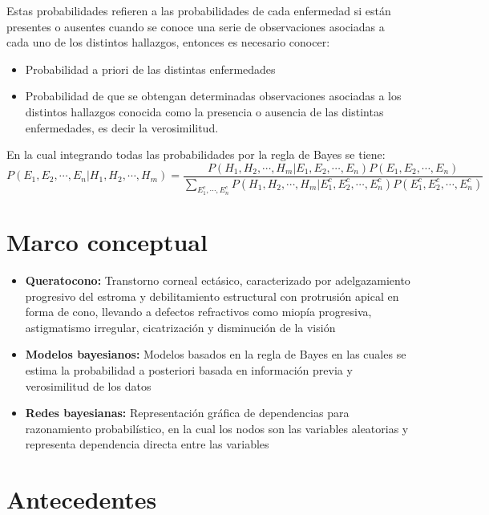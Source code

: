 Estas probabilidades refieren a las probabilidades de cada enfermedad si están presentes o ausentes cuando se conoce una serie de observaciones asociadas a cada uno de los distintos hallazgos, entonces es necesario conocer:

\begin{itemize}
\item Probabilidad a priori de las distintas enfermedades
\item Probabilidad de que se obtengan determinadas observaciones asociadas a los distintos hallazgos conocida como la presencia o ausencia de las distintas enfermedades, es decir la verosimilitud.
\end{itemize}
En la cual integrando todas las probabilidades por la regla de Bayes se tiene:
$$
P({E}_{1},{E}_{2},\cdots,{E}_{n}|{H}_{1},{H}_{2},\cdots,{H}_{m}) = \frac{P({H}_{1},{H}_{2},\cdots,{H}_{m}|{E}_{1},{E}_{2},\cdots,{E}_{n})P({E}_{1},{E}_{2},\cdots,{E}_{n})}{\sum\limits_{{E}_{1}^{c},\cdots,{E}_{n}^{c} }^{}P({H}_{1},{H}_{2},\cdots,{H}_{m}|{E}_{1}^{c},{E}_{2}^{c},\cdots,{E}_{n}^{c})P({E}_{1}^{c},{E}_{2}^{c},\cdots,{E}_{n}^{c})}
$$

\section{Marco conceptual}
\begin{itemize}
\item \textbf{Queratocono:} Transtorno corneal ectásico, caracterizado por adelgazamiento progresivo del estroma y debilitamiento estructural con protrusión apical en forma de cono, llevando a defectos refractivos como miopía progresiva, astigmatismo irregular, cicatrización y disminución de la visión \citep{caruso2024corneal}

\item \textbf{Modelos bayesianos:} Modelos basados en la regla de Bayes en las cuales se estima la probabilidad a posteriori basada en información previa y verosimilitud de los datos \citep{koski2011bayesian}

\item \textbf{Redes bayesianas:} Representación gráfica de dependencias para razonamiento probabilístico, en la cual los nodos son las variables aleatorias y representa dependencia directa entre las variables \citep{sucar2006redes}
\end{itemize}

\section{Antecedentes}

